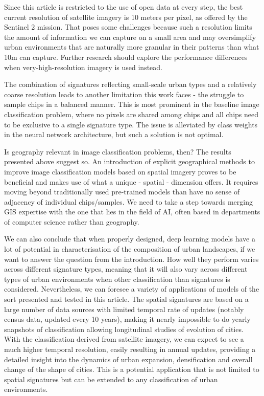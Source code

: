 Since this article is restricted to the use of open data at every step, the best current
resolution of satellite imagery is 10 meters per pixel, as offered by the Sentinel 2
mission. That poses some challenges because such a resolution limits the amount of
information we can capture on a small area and may oversimplify urban environments that
are naturally more granular in their patterns than what 10m can capture. Further
research should explore the performance differences when very-high-resolution
imagery is used instead.

The combination of signatures reflecting small-scale urban types and a relatively coarse
resolution leads to another limitation this work faces - the struggle to sample chips
in a balanced manner. This is most prominent in the baseline image classification
problem, where no pixels are shared among chips and all chips need to be exclusive to a
single signature type. The issue is alleviated by class weights in the neural network
architecture, but such a solution is not optimal.

Is geography relevant in image classification problems, then? The results presented
above suggest so. An introduction of explicit geographical methods to improve image
classification models based on spatial imagery proves to be beneficial and makes use of what a
unique - spatial - dimension offers. It requires moving beyond traditionally used
pre-trained models than have no sense of adjacency of individual chips/samples. We need
to take a step towards merging GIS expertise with the one that lies in the field of
AI, often based in departments of computer science rather than geography.

We can also conclude that when properly designed, deep learning models have a lot of potential
in characterisation of the composition of urban landscapes, if we want to answer the question
from the introduction. How well they perform varies across different signature types, meaning that
it will also vary across different types of urban environments when other classification than
signatures is considered. Nevertheless, we can foresee a variety of applications of
models of the sort presented and tested in this article. The spatial signatures are based on
a large number of data sources with limited temporal rate of updates (notably census data, updated every 10 years), making it nearly impossible to do yearly snapshots
of classification allowing longitudinal studies of evolution of cities. With the classification
derived from satellite imagery, we can expect to see a much higher temporal resolution,
easily resulting in annual updates, providing a detailed insight into the dynamics of urban
expansion, densification and overall change of the shape of cities. This is a potential
application that is not limited to spatial signatures but can be extended to any
classification of urban environments.


